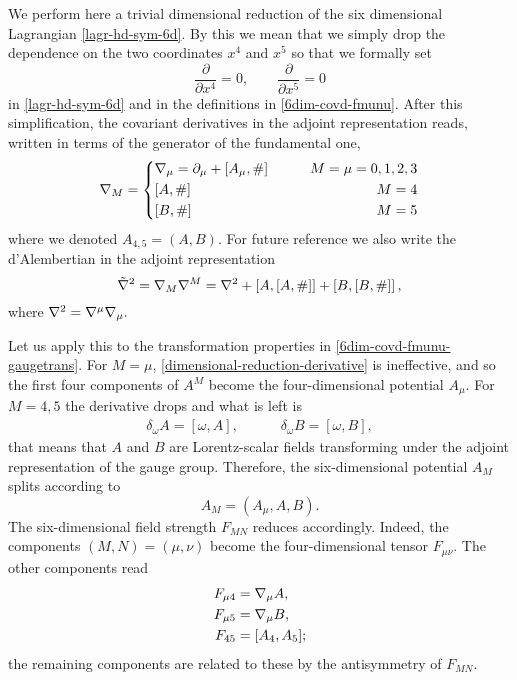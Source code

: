 We perform here a trivial dimensional reduction of the six dimensional Lagrangian \eqref{lagr-hd-sym-6d}.
By this we mean that we simply drop the dependence on the two coordinates $x^4$ and $x^5$ so that we formally set
\begin{equation}\label{dimensional-reduction-derivative}
\frac{\partial}{\partial x^4} = 0,
\qquad
\frac{\partial}{\partial x^5} = 0
\end{equation}
in \eqref{lagr-hd-sym-6d} and in the definitions in \eqref{6dim-covd-fmunu}. After this simplification, the covariant derivatives in the adjoint representation reads, written in terms of the generator of the fundamental one,
\begin{equation}\label{dimensional-reduction-covD}
{ \mathcal{\nabla} }_M = 
\left\lbrace
\begin{split}
 & { \mathcal{\nabla} }_\mu 	=\partial_\mu + [A_\mu,\#]	\qquad &  M = \mu = 0,1,2,3 \\
 & [A, \#] 									& M = 4 \\			
 & [B, \#]									& M = 5
\end{split}
\right.
\end{equation}
where we denoted $A_{4,5} = (A,B)$.
For future reference we also write the d'Alembertian 
in the adjoint representation
\begin{equation}\label{dimensional-reduction-covDcovD}
\tilde{{ \mathcal{\nabla} }}^2 =
{ \mathcal{\nabla} }_M { \mathcal{\nabla} }^M 
	=
	{ \mathcal{\nabla} }^2 
	+ \left[A, [A ,\#]\right]
	+ \left[B, [B,\#]\right],
\end{equation}
where ${ \mathcal{\nabla} }^2 = { \mathcal{\nabla} }^\mu { \mathcal{\nabla} }_\mu.$


Let us apply this to the transformation properties in \eqref{6dim-covd-fmunu-gaugetrans}. For $M = \mu$, \eqref{dimensional-reduction-derivative} is ineffective, and so the first four components of $A^M$  become  the four-dimensional \ym{} potential $A_\mu$. For $M= 4,5$ the derivative drops and what is left is 
\begin{align}
 \delta_\omega A = [\omega, A], \hspace{3em}
 \delta_\omega B = [\omega, B],
\end{align}
that means that $A$ and $B$ are Lorentz-scalar fields transforming under the adjoint representation of the gauge group. 
Therefore, the six-dimensional \ym{} potential $A_{M}$ splits according to 
\begin{equation}
A_M = ( A_\mu , A , B ).
\end{equation}
The six-dimensional field strength  $F_{MN}$ reduces accordingly. Indeed, the components $(M,N) = (\mu, \nu)$ become the four-dimensional tensor $F_{\mu\nu}$. The other components read
\begin{align}
F_{ \mu 4 } & = { \mathcal{\nabla} }_\mu A, \\
F_{ \mu 5 } & = { \mathcal{\nabla} }_\mu B, \\
F_{ 4 5 } & =  [ A_4 , A_5 ];
\end{align}
the remaining components are related to these by the antisymmetry of $F_{MN}$.



